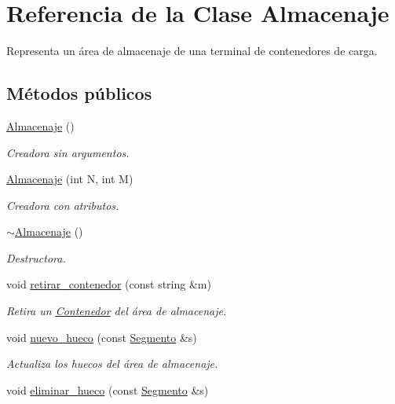 \hypertarget{class_almacenaje}{}\section{Referencia de la Clase Almacenaje}
\label{class_almacenaje}


Representa un área de almacenaje de una terminal de contenedores de carga.  


\subsection*{Métodos públicos}
\begin{DoxyCompactItemize}
\item 
\hyperlink{class_almacenaje_aac76140a19e358858ec775cae4d23037}{Almacenaje} ()
\begin{DoxyCompactList}\small\item\em Creadora sin argumentos. \end{DoxyCompactList}\item 
\hyperlink{class_almacenaje_a647530e3470da788413fe0288eeca339}{Almacenaje} (int N, int M)
\begin{DoxyCompactList}\small\item\em Creadora con atributos. \end{DoxyCompactList}\item 
\hyperlink{class_almacenaje_a81867a2596bd5b0d654803fc34d8bc9a}{$\sim$\+Almacenaje} ()
\begin{DoxyCompactList}\small\item\em Destructora. \end{DoxyCompactList}\item 
void \hyperlink{class_almacenaje_aa4a16321fcfba32873521b9af6c8b73a}{retirar\+\_\+contenedor} (const string \&m)
\begin{DoxyCompactList}\small\item\em Retira un \hyperlink{class_contenedor}{Contenedor} del área de almacenaje. \end{DoxyCompactList}\item 
void \hyperlink{class_almacenaje_ac98f7d262897f33ece29a432e111f02c}{nuevo\+\_\+hueco} (const \hyperlink{class_segmento}{Segmento} \&s)
\begin{DoxyCompactList}\small\item\em Actualiza los huecos del área de almacenaje. \end{DoxyCompactList}\item 
void \hyperlink{class_almacenaje_a20219014a2d5bf325df7245cd0822277}{eliminar\+\_\+hueco} (const \hyperlink{class_segmento}{Segmento} \&s)

\end{DoxyCompactItemize}
